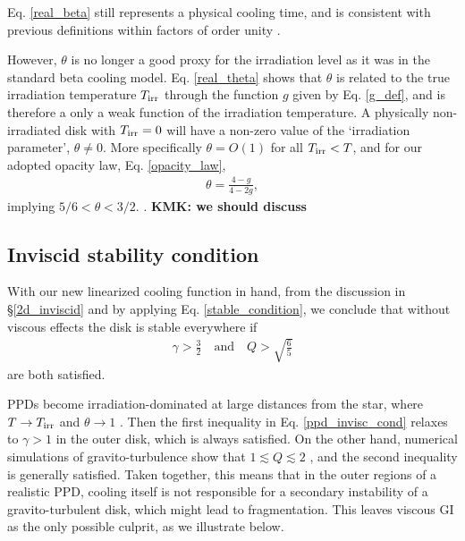 Eq. \ref{real_beta} still represents a physical cooling 
time, and is consistent with previous definitions within factors of
order unity \citep[e.g.][their Eq. 2]{kratter10}.  

However, $\theta$ is no longer a good proxy for the irradiation level
as it was in the standard beta cooling model.
Eq. \ref{real_theta} shows that $\theta$ is related to the true
irradiation temperature $T_\mathrm{irr}$ through the function $g$ given by 
Eq. \ref{g_def}, and is therefore a only a weak function of the irradiation temperature. 
A physically non-irradiated disk with $T_\mathrm{irr}=0$ will
have a non-zero value of the `irradiation parameter', $\theta\neq0$. More specifically $\theta = O(1)$ 
for all $T_\mathrm{irr} <T$, and for our adopted opacity law, Eq. \ref{opacity_law}, 
\begin{align*}
  \theta = \frac{4-g}{4-2g},
\end{align*}
implying $5/6<\theta<3/2$. . %
{\bf KMK: we should discuss}


\subsection{Inviscid stability condition}
With our new linearized cooling function in hand, from the discussion in \S\ref{2d_inviscid} and by applying
Eq. \ref{stable_condition},  we conclude that without viscous effects 
the disk is stable everywhere if  
\begin{align} 
  \gamma > \frac{3}{2} \quad \text{and} \quad Q >
  \sqrt{\frac{6}{5}} \label{ppd_invisc_cond} 
\end{align} 
are both satisfied.  

PPDs become irradiation-dominated at large distances from the star,
where $T\to T_\mathrm{irr}$ and $\theta\to 1$ \citep{dalessio97,kratter11}.
Then the first inequality in Eq. \ref{ppd_invisc_cond} relaxes to
$\gamma > 1$ in the outer disk, which is always satisfied.  
On the other hand, numerical simulations of gravito-turbulence
show that $1\lesssim Q \lesssim 2$ \citep{gammie01,rice11}, and 
the second inequality is generally satisfied. 
Taken together, this means that in the outer regions of a realistic PPD, cooling itself
is not responsible for a secondary instability of a gravito-turbulent disk,
which might lead to fragmentation. This leaves viscous GI as the only possible
culprit, as we illustrate below.

